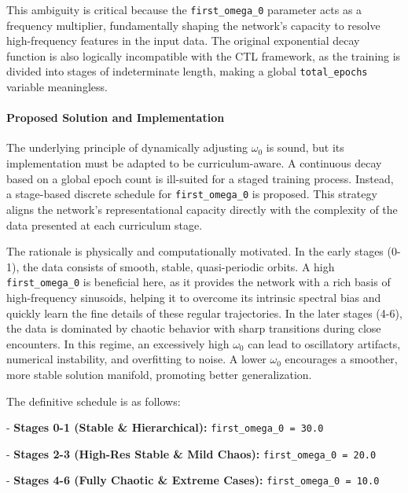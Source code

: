 \documentclass[11pt, a4paper]{article}
\begin{document}
This ambiguity is critical because the \texttt{first\_omega\_0} parameter acts as a frequency multiplier, fundamentally shaping the network's capacity to resolve high-frequency features in the input data. The original exponential decay function is also logically incompatible with the CTL framework, as the training is divided into stages of indeterminate length, making a global \texttt{total\_epochs} variable meaningless.

\paragraph{Proposed Solution and Implementation}
The underlying principle of dynamically adjusting $\omega_0$ is sound, but its implementation must be adapted to be curriculum-aware. A continuous decay based on a global epoch count is ill-suited for a staged training process. Instead, a stage-based discrete schedule for \texttt{first\_omega\_0} is proposed. This strategy aligns the network's representational capacity directly with the complexity of the data presented at each curriculum stage.

The rationale is physically and computationally motivated. In the early stages (0-1), the data consists of smooth, stable, quasi-periodic orbits. A high \texttt{first\_omega\_0} is beneficial here, as it provides the network with a rich basis of high-frequency sinusoids, helping it to overcome its intrinsic spectral bias and quickly learn the fine details of these regular trajectories. In the later stages (4-6), the data is dominated by chaotic behavior with sharp transitions during close encounters. In this regime, an excessively high $\omega_0$ can lead to oscillatory artifacts, numerical instability, and overfitting to noise. A lower $\omega_0$ encourages a smoother, more stable solution manifold, promoting better generalization.

The definitive schedule is as follows:

    
- \textbf{Stages 0-1 (Stable \& Hierarchical):} \texttt{first\_omega\_0 = 30.0}
    
- \textbf{Stages 2-3 (High-Res Stable \& Mild Chaos):} \texttt{first\_omega\_0 = 20.0}
    
- \textbf{Stages 4-6 (Fully Chaotic \& Extreme Cases):} \texttt{first\_omega\_0 = 10.0}
\end{document}
